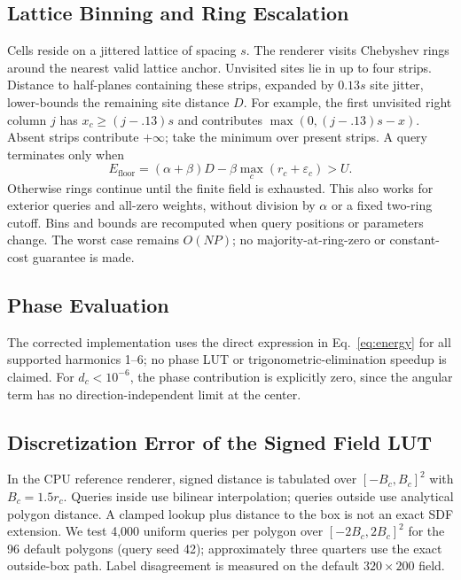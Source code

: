 \documentclass[sigconf,nonacm]{acmart}
\begin{document}
\subsection{Lattice Binning and Ring Escalation}

Cells reside on a jittered lattice of spacing $s$. The renderer visits
Chebyshev rings around the nearest valid lattice anchor. Unvisited sites lie
in up to four strips. Distance to half-planes containing these strips,
expanded by $0.13s$ site jitter, lower-bounds the remaining site distance $D$.
For example, the first unvisited right column $j$ has $x_c\ge(j-.13)s$ and
contributes $\max(0,(j-.13)s-x)$. Absent strips contribute $+\infty$; take
the minimum over present strips. A query terminates only when
\begin{equation}
E_{\mathrm{floor}}=(\alpha+\beta)D-\beta\max_c(r_c+\varepsilon_c)>U.
\label{eq:ring_floor}
\end{equation}
Otherwise rings continue until the finite field is exhausted. This also works
for exterior queries and all-zero weights, without division by $\alpha$ or
a fixed two-ring cutoff. Bins and bounds are recomputed when query positions
or parameters change. The worst case remains $O(NP)$; no majority-at-ring-zero
or constant-cost guarantee is made.

\subsection{Phase Evaluation}

The corrected implementation uses the direct expression in Eq.~\ref{eq:energy} for all
supported harmonics 1--6; no phase LUT or trigonometric-elimination speedup
is claimed. For $d_c<10^{-6}$, the phase contribution is explicitly zero,
since the angular term has no direction-independent limit at the center.

\subsection{Discretization Error of the Signed Field LUT}
\label{sec:lut_eval}

In the CPU reference renderer, signed distance is tabulated over
$[-B_c,B_c]^2$ with $B_c=1.5r_c$. Queries inside use bilinear interpolation;
queries outside use analytical polygon distance. A clamped lookup plus
distance to the box is not an exact SDF extension. We test 4,000 uniform
queries per polygon over $[-2B_c,2B_c]^2$ for the 96 default polygons (query
seed 42); approximately three quarters use the exact outside-box path.
Label disagreement is measured on the default $320\times200$ field.
\end{document}
